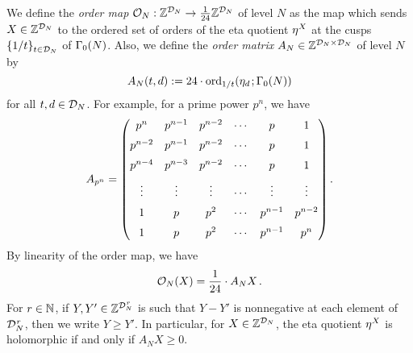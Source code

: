 \documentclass[a4paper,11pt]{amsart}
\begin{document}
We define the \emph{\hypertarget{om}{order map}}
$\mathcal{O}_N:\mathbb{Z}^{\mathcal{D}_N}\rightarrow\frac1{24}\mathbb{Z}^{\mathcal{D}_N}$ of level $N$ as the map which sends $X\in\mathbb{Z}^{\mathcal{D}_N}$ to the ordered set of
orders of the eta quotient $\eta^X$ at the cusps $\{1/t\}_{\substack{\ \\ t\in\mathcal{D}_N}}$ of $\Gamma_0(N)$. Also, we define the
\emph
{order matrix} $A_N\in\mathbb{Z}^{\mathcal{D}_N\times\mathcal{D}_N}$ of level $N$ by 
\begin{equation}
 A_N(t,d):=24\cdot\ord_{1/t}(\e_d\hspace{1pt};\GN) %
\label{27.04.2015}\end{equation}
for all $t,d\in\mathcal{D}_N$.
 For example, for a prime power $p^n$, %
we have
\begin{equation}
A_{p^n}=\begin{pmatrix}
 \vspace{5.8pt}p^n &p^{n-1} &p^{n-2} %
&\cdots  &p &1\\
\vspace{5.8pt} p^{n-2} &p^{n-1} &p^{n-2} %
&\cdots  &p &1\\
 \vspace{5.8pt}p^{n-4} &p^{n-3} &p^{n-2} %
&\cdots  &p &1\\
\vspace{5.8pt} \vdots &\vdots &\vdots %
&\cdots &\vdots &\vdots\\
\vspace{5.8pt} 1 &p &p^2 %
&\cdots &p^{n-1} &p^{n-2}\\
 1 &p &p^2 %
&\cdots  &p^{n-1} &p^n
\end{pmatrix}.
 \label{23July}
\end{equation}
By linearity of the order map, we have 
\begin{equation}
\mathcal{O}_N(X)=\frac1{24}\cdot A_NX\hspace{1.5pt}. 
\label{28.04}\end{equation}
For $r\in\mathbb{N}$, if $Y,Y'\in\mathbb{Z}^{\mathcal{D}_N^{\hspace{.5pt}r}}$ is 
such that $Y-Y'$ is
nonnegative at each element of $\mathcal{D}_N^{\hspace{.5pt}r}$, then
we write $Y\geq Y'$. %
In particular, for $X\in\mathbb{Z}^{\mathcal{D}_N}$, the eta quotient $\eta^X$ is holomorphic if and only if $A_NX\geq0$.
\end{document}
